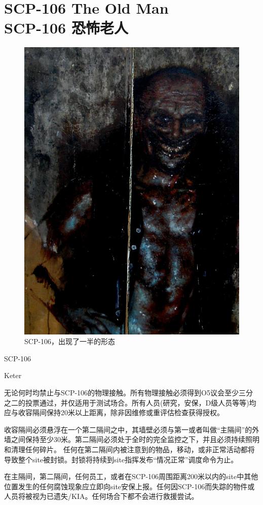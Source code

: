 \chapter[SCP-106 恐怖老人]{
    SCP-106 The Old Man\\
    SCP-106 恐怖老人
}

\label{chap:SCP-106}

\begin{figure}[H]
    \centering
    \includegraphics[width=0.5\linewidth]{images/SCP.106.jpg}
    \caption*{SCP-106，出现了一半的形态}
\end{figure}

SCP-106

Keter




无论何时均禁止与SCP-106的物理接触。所有物理接触必须得到O5议会至少三分之二的投票通过，并仅适用于测试场合。所有人员(研究，安保，D级人员等等)均应与收容隔间保持20米以上距离，除非因维修或重评估检查获得授权。

收容隔间必须悬浮在一个第二隔间之中，其墙壁必须与第一或者叫做“主隔间”的外墙之间保持至少30米。第二隔间必须处于全时的完全监控之下，并且必须持续照明和清理任何碎片。 任何在第二隔间内被注意到的物品，移动，或非正常活动都将导致整个site被封锁。封锁将持续到site指挥发布“情况正常”调度命令为止。

在主隔间，第二隔间，任何员工，或者在SCP-106周围距离200米以内的site中其他位置发生的任何腐蚀现象应立即向site安保上报。任何因SCP-106而失踪的物件或人员将被视为已遗失\slash KIA。任何场合下都不会进行救援尝试。

